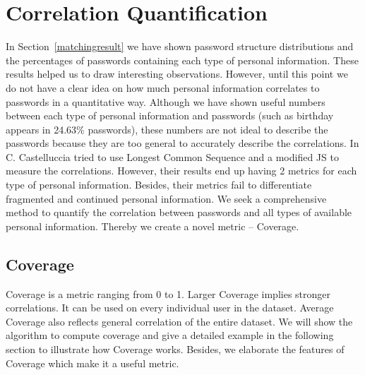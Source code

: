 \section{Correlation Quantification}
\label{correlationquantification}
In Section~\ref{matchingresult} we have shown password structure distributions and the percentages of passwords containing each type of personal information. These results helped us to draw interesting observations. However, until this point we do not have a clear idea on how much personal information correlates to passwords in a quantitative way. Although we have shown useful numbers between each type of personal information and passwords (such as birthday appears in 24.63\% passwords), these numbers are not ideal to describe the passwords because they are too general to accurately describe the correlations. In \cite{castelluccia2013privacy} C. Castelluccia tried to use Longest Common Sequence and a modified JS to measure the correlations. However, their results end up having 2 metrics for each type of personal information. Besides, their metrics fail to differentiate fragmented and continued personal information. We seek a comprehensive method to quantify the correlation between passwords and all types of available personal information. Thereby we create a novel metric -- Coverage.

\subsection{Coverage}
\label{coverage}
Coverage is a metric ranging from 0 to 1. Larger Coverage implies stronger correlations. It can be used on every individual user in the dataset. Average Coverage also reflects general correlation of the entire dataset. We will show the algorithm to compute coverage and give a detailed example in the following section to illustrate how Coverage works. Besides, we elaborate the features of Coverage which make it a useful metric.
